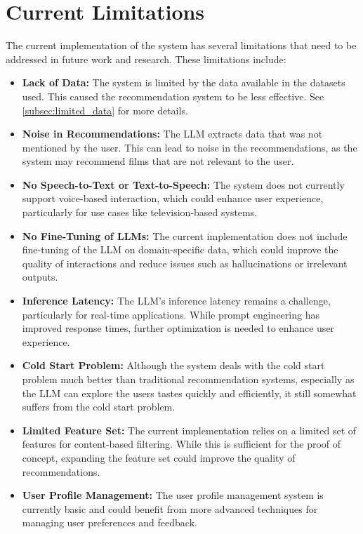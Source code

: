 \section{Current Limitations}
\label{sec:current_limitations}
The current implementation of the system has several limitations that need to be addressed in future work and research. These limitations include:
\begin{itemize}
    \item \textbf{Lack of Data:} The system is limited by the data available in the datasets used. This caused the recommendation system to be less effective. See \cref{subsec:limited_data} for more details.
    \item \textbf{Noise in Recommendations:} The LLM extracts data that was not mentioned by the user. This can lead to noise in the recommendations, as the system may recommend films that are not relevant to the user.
    \item \textbf{No Speech-to-Text or Text-to-Speech:} The system does not currently support voice-based interaction, which could enhance user experience, particularly for use cases like television-based systems.
    \item \textbf{No Fine-Tuning of LLMs:} The current implementation does not include fine-tuning of the LLM on domain-specific data, which could improve the quality of interactions and reduce issues such as hallucinations or irrelevant outputs.
    \item \textbf{Inference Latency:} The LLM's inference latency remains a challenge, particularly for real-time applications. While prompt engineering has improved response times, further optimization is needed to enhance user experience.
    \item \textbf{Cold Start Problem:} Although the system deals with the cold start problem much better than traditional recommendation systems, especially as the LLM can explore the users tastes quickly and efficiently, it still somewhat suffers from the cold start problem.
    \item \textbf{Limited Feature Set:} The current implementation relies on a limited set of features for content-based filtering. While this is sufficient for the proof of concept, expanding the feature set could improve the quality of recommendations.
    \item \textbf{User Profile Management:} The user profile management system is currently basic and could benefit from more advanced techniques for managing user preferences and feedback.
\end{itemize}

